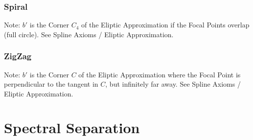 \documentclass{report}
\begin{document}
\subsection{Spiral}
Note: $b'$ is the Corner $C_{4}$ of the Eliptic Approximation if the Focal Points overlap (full circle). See Spline Axioms / Eliptic Approximation.

\subsection{ZigZag}
Note: $b'$ is the Corner $C$ of the Eliptic Approximation where the Focal Point is perpendicular to the tangent in $C$, but infinitely far away. See Spline Axioms / Eliptic Approximation.

\chapter{Spectral Separation}
\end{document}
